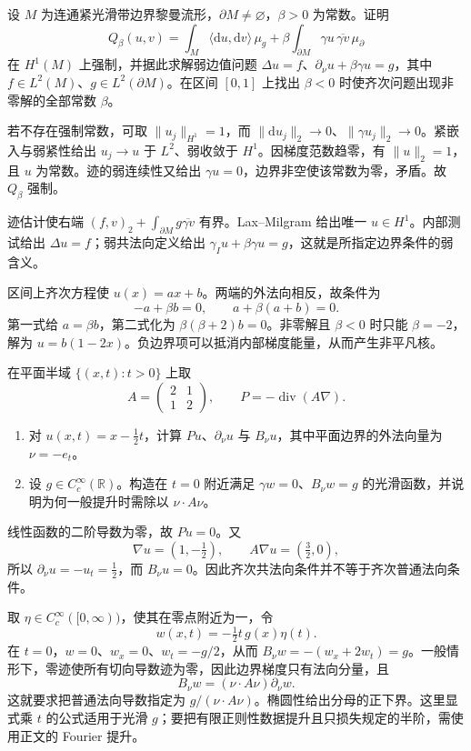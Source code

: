 \begin{exercise}\label{g3:ex:positive-boundary-energy}
	设 \(M\) 为连通紧光滑带边界黎曼流形，\(\partial M\ne\varnothing\)，\(\beta>0\) 为常数。证明
	\[
		Q_\beta(u,v)=\int_M\langle\mathrm du,\mathrm dv\rangle\,\mu_g
		+\beta\int_{\partial M}\gamma u\,\overline{\gamma v}\,\mu_{\partial}
	\]
	在 \(H^1(M)\) 上强制，并据此求解弱边值问题
	\(\Delta u=f\)、\(\partial_\nu u+\beta\gamma u=g\)，其中 \(f\in L^2(M)\)、\(g\in L^2(\partial M)\)。在区间 \([0,1]\) 上找出 \(\beta<0\) 时使齐次问题出现非零解的全部常数 \(\beta\)。
\end{exercise}
\begin{solution}
	若不存在强制常数，可取 \(\|u_j\|_{H^1}=1\)，而 \(\|\mathrm du_j\|_2\to0\)、\(\|\gamma u_j\|_2\to0\)。紧嵌入与弱紧性给出 \(u_j\to u\) 于 \(L^2\)、弱收敛于 \(H^1\)。因梯度范数趋零，有 \(\|u\|_2=1\)，且 \(u\) 为常数。迹的弱连续性又给出 \(\gamma u=0\)，边界非空使该常数为零，矛盾。故 \(Q_\beta\) 强制。

	迹估计使右端 \((f,v)_2+\int_{\partial M}g\overline{\gamma v}\) 有界。Lax--Milgram 给出唯一 \(u\in H^1\)。内部测试给出 \(\Delta u=f\)；弱共法向定义给出 \(\gamma_Iu+\beta\gamma u=g\)，这就是所指定边界条件的弱含义。

	区间上齐次方程使 \(u(x)=a x+b\)。两端的外法向相反，故条件为
	\[
		-a+\beta b=0,\qquad a+\beta(a+b)=0.
	\]
	第一式给 \(a=\beta b\)，第二式化为 \(\beta(\beta+2)b=0\)。非零解且 \(\beta<0\) 时只能 \(\beta=-2\)，解为 \(u=b(1-2x)\)。负边界项可以抵消内部梯度能量，从而产生非平凡核。
\end{solution}

\begin{exercise}\label{g3:ex:conormal-not-normal}
	在平面半域 \(\{(x,t):t>0\}\) 上取
	\[
	A=\begin{pmatrix}2&1\\1&2\end{pmatrix},\qquad
	P=-\operatorname{div}(A\nabla).
	\]
	\begin{enumerate}
		\item 对 \(u(x,t)=x-\tfrac12t\)，计算 \(Pu\)、\(\partial_\nu u\) 与 \(B_\nu u\)，其中平面边界的外法向量为 \(\nu=-e_t\)。
		\item 设 \(g\in C_c^\infty(\mathbb R)\)。构造在 \(t=0\) 附近满足
		\(\gamma w=0\)、\(B_\nu w=g\) 的光滑函数，并说明为何一般提升时需除以 \(\nu\cdot A\nu\)。
	\end{enumerate}
\end{exercise}
\begin{solution}
	线性函数的二阶导数为零，故 \(Pu=0\)。又
	\[
	\nabla u=(1,-\tfrac12),\qquad
	A\nabla u=(\tfrac32,0),
	\]
	所以 \(\partial_\nu u=-u_t=\tfrac12\)，而 \(B_\nu u=0\)。因此齐次共法向条件并不等于齐次普通法向条件。

	取 \(\eta\in C_c^\infty([0,\infty))\)，使其在零点附近为一，令
	\[
	w(x,t)=-\tfrac12t\,g(x)\eta(t).
	\]
	在 \(t=0\)，\(w=0\)、\(w_x=0\)、\(w_t=-g/2\)，从而
	\(B_\nu w=-(w_x+2w_t)=g\)。一般情形下，零迹使所有切向导数迹为零，因此边界梯度只有法向分量，且
	\[
	B_\nu w=(\nu\cdot A\nu)\partial_\nu w.
	\]
	这就要求把普通法向导数指定为 \(g/(\nu\cdot A\nu)\)。椭圆性给出分母的正下界。这里显式乘 \(t\) 的公式适用于光滑 \(g\)；要把有限正则性数据提升且只损失规定的半阶，需使用正文的 Fourier 提升。
\end{solution}

